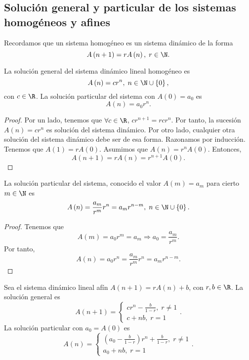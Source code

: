 \subsection{Solución general y particular de los sistemas homogéneos y afines}
Recordamos que un sistema homogéneo es un sistema dinámico de la forma
\[A\left(n + 1\right) = rA\left(n\right), \; r \in \N .\]
\begin{ftheorem}[]
\normalfont La solución general del sistema dinámico lineal homogéneo es
\[ A\left(n\right) = cr^{n}, \; n \in \N \cup \left\{ 0\right\}  ,\]
con $\displaystyle c \in \R $. La solución particular del sistema con $\displaystyle A\left(0\right) = a_{0} $ es 
\[A\left(n\right) = a_{0}r^{n} .\]
\end{ftheorem}
\begin{proof}
Por un lado, tenemos que $\displaystyle \forall c \in \R $, $\displaystyle cr^{n+1} =rcr^{n} $. Por tanto, la sucesión $\displaystyle A\left(n\right) = cr^{n} $ es solución del sistema dinámico. Por otro lado, cualquier otra solución del sistema dinámico debe ser de esa forma. Razonamos por inducción. Tenemos que $\displaystyle A\left(1\right) = rA\left(0\right) $. Asumimos que $\displaystyle A\left(n\right) = r^{n}A\left(0\right) $. Entonces,
\[A\left(n+1\right) = rA\left(n\right) = r^{n+1}A\left(0\right) .\]
\end{proof}
\begin{fcolorary}[]
\normalfont La solución particular del sistema, conocido el valor $\displaystyle A\left(m\right) = a_{m} $ para cierto $\displaystyle m \in \N $ es 
\[A\left(n\right) = \frac{a_{m}}{r^{m}}r^{n} = a_{m}r^{n-m}, \; n \in \N \cup \left\{ 0\right\}  .\]
\end{fcolorary}
\begin{proof}
Tenemos que 
\[A\left(m\right) = a_{0}r^{m} = a_{m} \Rightarrow a_{0} = \frac{a_{m}}{r^{m}} .\]
Por tanto,
\[A\left(n\right) = a_{0}r^{n} = \frac{a_{m}}{r^{m}}r^{n} = a_{m}r^{n - m} .\]
\end{proof}
\begin{ftheorem}[]
\normalfont Sea el sistema dinámico lineal afín $\displaystyle A\left(n+1\right) = rA\left(n\right) + b $, con $\displaystyle r,b \in \R $. La solución general es
\[A\left(n+1\right) = 
\begin{cases}
cr^{n} - \frac{b}{1-r}, \; r \neq 1\\
c + nb, \; r = 1
\end{cases}
.\]
La solución particular con $\displaystyle a_{0} = A\left(0\right) $ es
\[A\left(n\right) =
\begin{cases}
	\left(a_{0}-\frac{b}{1-r}\right)r^{n}+\frac{b}{1-r}, \; r \neq 1 \\
	a_{0} + nb, \; r = 1
\end{cases}
.\]
\end{ftheorem}
